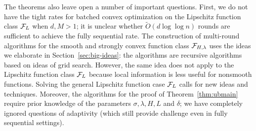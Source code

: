 %
%

The theorems also leave open a number of important questions.  First, we do
not have the tight rates for batched convex optimization on the Lipschitz
function class $\mathcal{F}_L$ when $d, M > 1$; it is unclear whether
$\tilde{O}(d \log \log n)$ rounds are sufficient to achieve the fully
sequential rate.  The construction of multi-round algorithms for the smooth
and strongly convex function class $\mathcal{F}_{H, \lambda}$ uses the ideas we
elaborate in Section~\ref{sec:big-ideas}: the algorithms are recursive
algorithms based on ideas of grid search.  However, the same idea does not
apply to the Lipschitz function class $\mathcal{F}_L$ because local information
is less useful for nonsmooth functions.  Solving the general Lipschitz
function case $\mathcal{F}_L$ calls for new ideas and techniques.
Moreover, the algorithms for the proof of Theorem~\ref{thm:ubmain} require
prior knowledge of the parameters $\sigma, \lambda, H, L$ and $\delta$;
we have completely ignored questions of adaptivity (which still provide
challenge even in fully sequential settings).



